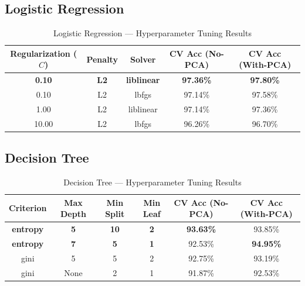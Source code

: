 \documentclass[12pt,a4paper]{article}
\begin{document}
\subsection{Logistic Regression}
\begin{table}[H]
\centering
\caption{Logistic Regression — Hyperparameter Tuning Results}
\begin{tabular}{ccccc}
\toprule
\textbf{Regularization ($C$)} & \textbf{Penalty} & \textbf{Solver} & \textbf{CV Acc (No-PCA)} & \textbf{CV Acc (With-PCA)} \\
\midrule
\textbf{0.10} & \textbf{L2} & \textbf{liblinear} & \textbf{97.36\%} & \textbf{97.80\%} \\
0.10 & L2 & lbfgs & 97.14\% & 97.58\% \\
1.00 & L2 & liblinear & 97.14\% & 97.36\% \\
10.00 & L2 & lbfgs & 96.26\% & 96.70\% \\
\bottomrule
\end{tabular}
\end{table}

\subsection{Decision Tree}
\begin{table}[H]
\centering
\caption{Decision Tree — Hyperparameter Tuning Results}
\begin{tabular}{cccccc}
\toprule
\textbf{Criterion} & \textbf{Max Depth} & \textbf{Min Split} & \textbf{Min Leaf} & \textbf{CV Acc (No-PCA)} & \textbf{CV Acc (With-PCA)} \\
\midrule
\textbf{entropy} & \textbf{5} & \textbf{10} & \textbf{2} & \textbf{93.63\%} & 93.85\% \\
\textbf{entropy} & \textbf{7} & \textbf{5} & \textbf{1} & 92.53\% & \textbf{94.95\%} \\
gini & 5 & 5 & 2 & 92.75\% & 93.19\% \\
gini & None & 2 & 1 & 91.87\% & 92.53\% \\
\bottomrule
\end{tabular}
\end{table}
\end{document}
